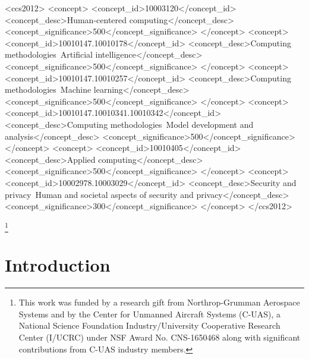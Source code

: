 \documentclass[format=manuscript, screen,review=true]{acmart}
\begin{document}
\begin{CCSXML}
<ccs2012>
<concept>
<concept_id>10003120</concept_id>
<concept_desc>Human-centered computing</concept_desc>
<concept_significance>500</concept_significance>
</concept>
<concept>
<concept_id>10010147.10010178</concept_id>
<concept_desc>Computing methodologies~Artificial intelligence</concept_desc>
<concept_significance>500</concept_significance>
</concept>
<concept>
<concept_id>10010147.10010257</concept_id>
<concept_desc>Computing methodologies~Machine learning</concept_desc>
<concept_significance>500</concept_significance>
</concept>
<concept>
<concept_id>10010147.10010341.10010342</concept_id>
<concept_desc>Computing methodologies~Model development and analysis</concept_desc>
<concept_significance>500</concept_significance>
</concept>
<concept>
<concept_id>10010405</concept_id>
<concept_desc>Applied computing</concept_desc>
<concept_significance>500</concept_significance>
</concept>
<concept>
<concept_id>10002978.10003029</concept_id>
<concept_desc>Security and privacy~Human and societal aspects of security and privacy</concept_desc>
<concept_significance>300</concept_significance>
</concept>
</ccs2012>
\end{CCSXML}




\thanks{This work was funded by a research gift from Northrop-Grumman Aerospace Systems and by the Center for Unmanned Aircraft Systems (C-UAS), a National Science Foundation Industry/University Cooperative Research Center (I/UCRC) under NSF Award No. CNS-1650468 along with significant contributions from C-UAS industry members.}

\maketitle

\section{Introduction}\label{sec:introduction}

\end{document}
